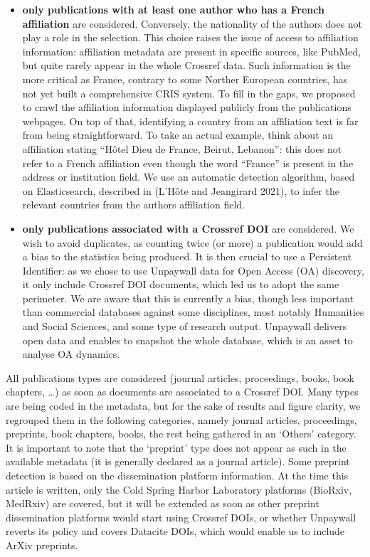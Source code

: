 \documentclass[
]{article}
\begin{document}
\begin{itemize}
\item
  \textbf{only publications with at least one author who has a French
  affiliation} are considered. Conversely, the nationality of the
  authors does not play a role in the selection. This choice raises the
  issue of access to affiliation information: affiliation metadata are
  present in specific sources, like PubMed, but quite rarely appear in
  the whole Crossref data. Such information is the more critical as
  France, contrary to some Norther European countries, has not yet built
  a comprehensive CRIS system. To fill in the gaps, we proposed to crawl
  the affiliation information displayed publicly from the publications
  webpages. On top of that, identifying a country from an affiliation
  text is far from being straightforward. To take an actual example,
  think about an affiliation stating ``Hôtel Dieu de France, Beirut,
  Lebanon'': this does not refer to a French affiliation even though the
  word ``France'' is present in the address or institution field. We use
  an automatic detection algorithm, based on Elasticsearch, described in
  (L'Hôte and Jeangirard 2021), to infer the relevant countries from the
  authors affiliation field.
\item
  \textbf{only publications associated with a Crossref DOI} are
  considered. We wish to avoid duplicates, as counting twice (or more) a
  publication would add a bias to the statistics being produced. It is
  then crucial to use a Persistent Identifier: as we chose to use
  Unpaywall data for Open Access (OA) discovery, it only include
  Crossref DOI documents, which led us to adopt the same perimeter. We
  are aware that this is currently a bias, though less important than
  commercial databases against some disciplines, most notably Humanities
  and Social Sciences, and some type of research output. Unpaywall
  delivers open data and enables to snapshot the whole database, which
  is an asset to analyse OA dynamics.
\end{itemize}

All publications types are considered (journal articles, proceedings,
books, book chapters, \ldots) as soon as documents are associated to a
Crossref DOI. Many types are being coded in the metadata, but for the
sake of results and figure clarity, we regrouped them in the following
categories, namely journal articles, proceedings, preprints, book
chapters, books, the rest being gathered in an `Others' category. It is
important to note that the `preprint' type does not appear as such in
the available metadata (it is generally declared as a journal article).
Some preprint detection is based on the dissemination platform
information. At the time this article is written, only the Cold Spring
Harbor Laboratory platforms (BioRxiv, MedRxiv) are covered, but it will
be extended as soon as other preprint dissemination platforms would
start using Crossref DOIs, or whether Unpaywall reverts its policy and
covers Datacite DOIs, which would enable us to include ArXiv preprints.
\end{document}
